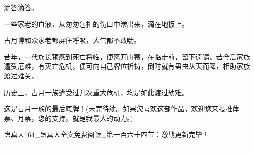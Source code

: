 \begin{this_body}
滴答滴答。

一些家老的血液，从匆匆包扎的伤口中渗出来，滴在地板上。

古月博和众家老都屏住呼吸，大气都不敢喘。

昔年，一代族长预感到死亡将临，便离开山寨，在临走前，留下遗嘱。若今后家族遭受厄难，有灭亡危机，便可向自己牌位祈祷，倒时就有蛊虫从天而降，相助家族渡过难关。

历史上，古月一族遭受过几次重大危机，均是如此渡过劫难。

这是古月一族的最后底牌！(未完待续。如果您喜欢这部作品，欢迎您来投推荐票、月票，您的支持，就是我最大的动力。)

蛊真人164\_蛊真人全文免费阅读\_第一百六十四节：激战更新完毕！

------------

\end{this_body}

